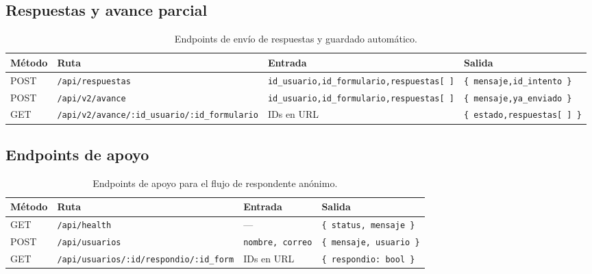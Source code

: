 \documentclass[12pt,a4paper]{article}
\begin{document}
\subsection{Respuestas y avance parcial}

\begin{table}[H]
\centering
\renewcommand{\arraystretch}{1.5}
\begin{tabular}{p{1.2cm} p{5cm} p{4cm} p{3.5cm}}
\toprule
\textbf{Método} & \textbf{Ruta} & \textbf{Entrada} & \textbf{Salida} \\
\midrule
POST & \texttt{/api/respuestas} &
  \texttt{id\_usuario,}\newline\texttt{id\_formulario,}\newline\texttt{respuestas[ ]} &
  \texttt{\{ mensaje,}\newline\texttt{id\_intento \}} \\
\midrule
POST & \texttt{/api/v2/avance} &
  \texttt{id\_usuario,}\newline\texttt{id\_formulario,}\newline\texttt{respuestas[ ]} &
  \texttt{\{ mensaje,}\newline\texttt{ya\_enviado \}} \\
\midrule
GET  & \texttt{/api/v2/avance/}\newline\texttt{:id\_usuario/:id\_formulario} &
  IDs en URL &
  \texttt{\{ estado,}\newline\texttt{respuestas[ ] \}} \\
\bottomrule
\end{tabular}
\caption{Endpoints de envío de respuestas y guardado automático.}
\end{table}

\subsection{Endpoints de apoyo}

\begin{table}[H]
\centering
\renewcommand{\arraystretch}{1.5}
\begin{tabular}{p{1.2cm} p{5.5cm} p{3cm} p{3.5cm}}
\toprule
\textbf{Método} & \textbf{Ruta} & \textbf{Entrada} & \textbf{Salida} \\
\midrule
GET  & \texttt{/api/health} &
  — &
  \texttt{\{ status, mensaje \}} \\
\midrule
POST & \texttt{/api/usuarios} &
  \texttt{nombre, correo} &
  \texttt{\{ mensaje, usuario \}} \\
\midrule
GET  & \texttt{/api/usuarios/:id/}\newline\texttt{respondio/:id\_form} &
  IDs en URL &
  \texttt{\{ respondio: bool \}} \\
\bottomrule
\end{tabular}
\caption{Endpoints de apoyo para el flujo de respondente anónimo.}
\end{table}
\end{document}
